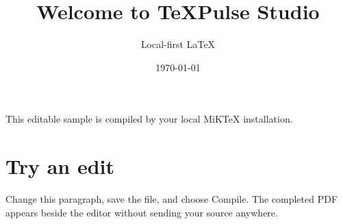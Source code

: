 \documentclass{article}
\title{Welcome to TeXPulse Studio}
\author{Local-first LaTeX}
\date{\today}
\begin{document}
\maketitle

This editable sample is compiled by your local MiKTeX installation.

\section{Try an edit}

Change this paragraph, save the file, and choose Compile. The completed PDF
appears beside the editor without sending your source anywhere.
\end{document}
